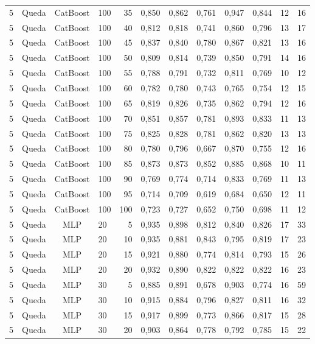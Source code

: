 \begin{longtable}{ccclrrrrrrrr}
5 & Queda & CatBoost & 100 & 35 & 0,850 & 0,862 & 0,761 & 0,947 & 0,844 & 12 & 16 \\
5 & Queda & CatBoost & 100 & 40 & 0,812 & 0,818 & 0,741 & 0,860 & 0,796 & 13 & 17 \\
5 & Queda & CatBoost & 100 & 45 & 0,837 & 0,840 & 0,780 & 0,867 & 0,821 & 13 & 16 \\
5 & Queda & CatBoost & 100 & 50 & 0,809 & 0,814 & 0,739 & 0,850 & 0,791 & 14 & 16 \\
5 & Queda & CatBoost & 100 & 55 & 0,788 & 0,791 & 0,732 & 0,811 & 0,769 & 10 & 12 \\
5 & Queda & CatBoost & 100 & 60 & 0,782 & 0,780 & 0,743 & 0,765 & 0,754 & 12 & 15 \\
5 & Queda & CatBoost & 100 & 65 & 0,819 & 0,826 & 0,735 & 0,862 & 0,794 & 12 & 16 \\
5 & Queda & CatBoost & 100 & 70 & 0,851 & 0,857 & 0,781 & 0,893 & 0,833 & 11 & 13 \\
5 & Queda & CatBoost & 100 & 75 & 0,825 & 0,828 & 0,781 & 0,862 & 0,820 & 13 & 13 \\
5 & Queda & CatBoost & 100 & 80 & 0,780 & 0,796 & 0,667 & 0,870 & 0,755 & 12 & 16 \\
5 & Queda & CatBoost & 100 & 85 & 0,873 & 0,873 & 0,852 & 0,885 & 0,868 & 10 & 11 \\
5 & Queda & CatBoost & 100 & 90 & 0,769 & 0,774 & 0,714 & 0,833 & 0,769 & 11 & 13 \\
5 & Queda & CatBoost & 100 & 95 & 0,714 & 0,709 & 0,619 & 0,684 & 0,650 & 12 & 11 \\
5 & Queda & CatBoost & 100 & 100 & 0,723 & 0,727 & 0,652 & 0,750 & 0,698 & 11 & 12 \\
5 & Queda & MLP & 20 & 5 & 0,935 & 0,898 & 0,812 & 0,840 & 0,826 & 17 & 33 \\
5 & Queda & MLP & 20 & 10 & 0,935 & 0,881 & 0,843 & 0,795 & 0,819 & 17 & 23 \\
5 & Queda & MLP & 20 & 15 & 0,921 & 0,880 & 0,774 & 0,814 & 0,793 & 15 & 26 \\
5 & Queda & MLP & 20 & 20 & 0,932 & 0,890 & 0,822 & 0,822 & 0,822 & 16 & 23 \\
5 & Queda & MLP & 30 & 5 & 0,885 & 0,891 & 0,678 & 0,903 & 0,774 & 16 & 59 \\
5 & Queda & MLP & 30 & 10 & 0,915 & 0,884 & 0,796 & 0,827 & 0,811 & 16 & 32 \\
5 & Queda & MLP & 30 & 15 & 0,917 & 0,899 & 0,773 & 0,866 & 0,817 & 15 & 28 \\
5 & Queda & MLP & 30 & 20 & 0,903 & 0,864 & 0,778 & 0,792 & 0,785 & 15 & 22 \\

\end{longtable}
